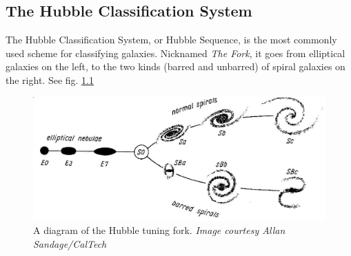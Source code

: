 \documentclass[12pt,twoside]{reedthesis}
\begin{document}
\begin{appendices}
    \chapter{}
        \section{The Hubble Classification System} \label{hubble-fork}
            The Hubble Classification System, or Hubble Sequence, is the most commonly used scheme for classifying galaxies. Nicknamed \emph{The Fork}, it goes from elliptical galaxies on the left, to the two kinds (barred and unbarred) of spiral galaxies on the right. See fig. \ref{hubble}

            \begin{figure}
                \includegraphics[width=\textwidth]{imgs/hubble_seq}
                \caption{A diagram of the Hubble tuning fork. \emph{Image courtesy Allan Sandage/CalTech}}
                \label{hubble}
            \end{figure}
\end{appendices}



  \backmatter %

    \nocite{*}


%  
 

\end{document}
